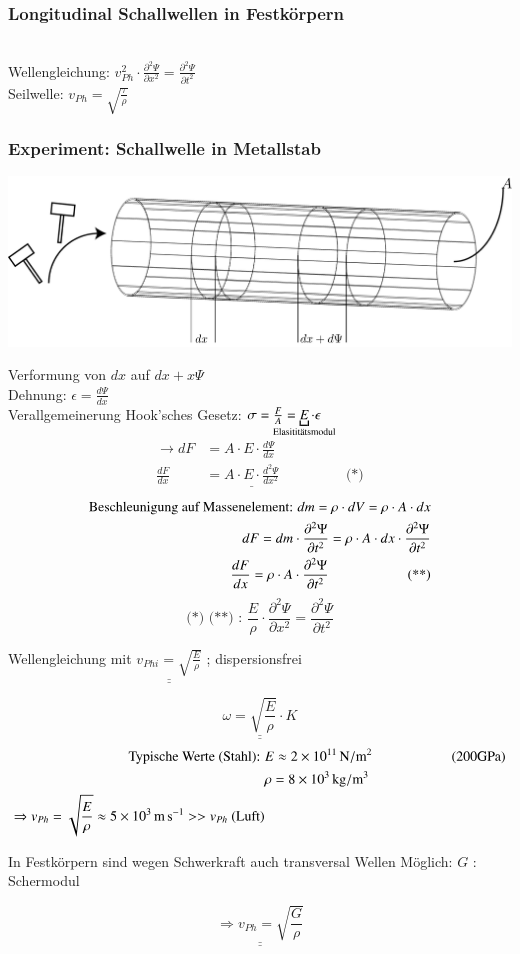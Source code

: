 \subsubsection{Longitudinal Schallwellen in Festkörpern}\hfill\\
Wellengleichung: $ v_{Ph}^2 \cdot \frac{\partial^2\Psi}{\partial x^2} = \frac{\partial^2\Psi}{\partial t^2} $\\
Seilwelle: $ v_{Ph} = \sqrt{\frac{\tau}{\rho}} $\\
\subsubsection{Experiment: Schallwelle in Metallstab}
\enter
\begin{center}
	\includegraphics[width=0.7\linewidth]{skizzen/19/19B25}
\end{center}
Verformung von $ dx $ auf $ dx+x\Psi $\\
Dehnung: $ \epsilon = \frac{d\Psi}{dx} $\\
Verallgemeinerung Hook'sches Gesetz: $ \sigma = \frac{F}{A} = \underbracket{E}_{\mathclap{\text{Elasititätsmodul}}} \cdot \epsilon$\\
\begin{align*}
\rightarrow dF &= A \cdot E \cdot \frac{d\Psi}{dx}\\
\frac{dF}{dx} &= \underline{A \cdot E \cdot \frac{d^2\Psi}{dx^2}} \hspace{2cm} \text{(*)}
\end{align*}
\begin{align*}
\text{Beschleunigung auf Massenelement: }  dm = \rho\cdot dV = \rho\cdot A \cdot dx \\
dF = dm \cdot \frac{\partial^2\Psi}{\partial t^2} = \rho \cdot A \cdot dx \cdot \frac{\partial^2\Psi}{\partial t^2}\\
\frac{dF}{dx} = \rho \cdot A \cdot \frac{\partial^2\Psi}{\partial t^2} \hspace{2cm} \text{(**)}
\enter
\end{align*}
$$ \text{(*) (**) : } \boxed{\frac{E}{\rho} \cdot \frac{\partial^2\Psi}{\partial x^2} =  \frac{\partial^2 \Psi}{\partial t^2}} $$
\begin{center}
	Wellengleichung mit $ \underline{\underline{v_{Phi} = \sqrt{\frac{E}{\rho}}}} $ ; dispersionsfrei
\end{center}
$$ \underline{\underline{\omega = \sqrt{\frac{E}{\rho}} \cdot K}} $$
\begin{align*}
\text{Typische Werte (Stahl): } &E \approx \SI{2E11}{\newton\per\meter^2} \hspace{2cm} (200\si{\giga\pascal}) \\
&\rho = \SI{8E3}{\kilogram\per\meter^3}\\
\Rightarrow v_{Ph} = \sqrt{\frac{E}{\rho}} \approx \SI{5E3}{\meter\per\second} >> v_{Ph} \text{ (Luft)}
\end{align*}

In Festkörpern sind wegen Schwerkraft auch transversal Wellen Möglich: \hspace{2cm} $ G $ : Schermodul

$$ \underline{\underline{\Rightarrow v_{Ph} = \sqrt{\frac{G}{\rho}}}} $$